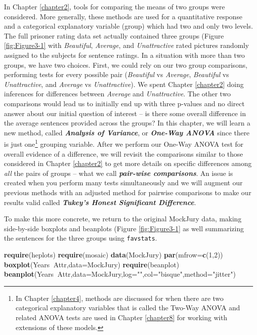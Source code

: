\documentclass[]{book}
\newenvironment{Shaded}{\begin{snugshade}}{\end{snugshade}}
\newcommand{\KeywordTok}[1]{\textcolor[rgb]{0.13,0.29,0.53}{\textbf{#1}}}
\newcommand{\DataTypeTok}[1]{\textcolor[rgb]{0.13,0.29,0.53}{#1}}
\newcommand{\DecValTok}[1]{\textcolor[rgb]{0.00,0.00,0.81}{#1}}
\newcommand{\StringTok}[1]{\textcolor[rgb]{0.31,0.60,0.02}{#1}}
\newcommand{\OperatorTok}[1]{\textcolor[rgb]{0.81,0.36,0.00}{\textbf{#1}}}
\newcommand{\NormalTok}[1]{#1}
\let\rmarkdownfootnote\footnote%
\def\footnote{\protect\rmarkdownfootnote}
\theoremstyle{definition}
\theoremstyle{definition}
\theoremstyle{remark}
\begin{document}
In Chapter \ref{chapter2}, tools for comparing the means of two groups
were considered. More generally, these methods are used for a
quantitative response and a categorical explanatory variable (group)
which had two and only two levels. The full prisoner rating data set
actually contained three groups (Figure \ref{fig:Figure3-1} with
\emph{Beautiful}, \emph{Average}, and \emph{Unattractive} rated pictures
randomly assigned to the subjects for sentence ratings. In a situation
with more than two groups, we have two choices. First, we could rely on
our two group comparisons, performing tests for every possible pair
(\emph{Beautiful} vs \emph{Average}, \emph{Beautiful} vs
\emph{Unattractive}, and \emph{Average} vs \emph{Unattractive}). We
spent Chapter \ref{chapter2} doing inferences for differences between
\emph{Average} and \emph{Unattractive}. The other two comparisons would
lead us to initially end up with three p-values and no direct answer
about our initial question of interest -- is there some overall
difference in the average sentences provided across the groups? In this
chapter, we will learn a new method, called \textbf{\emph{Analysis of
Variance}}, or \textbf{\emph{One-Way ANOVA}} since there is just
one\footnote{In Chapter \ref{chapter4}, methods are discussed for when
  there are two categorical explanatory variables that is called the
  Two-Way ANOVA and related ANOVA tests are used in Chapter
  \ref{chapter8} for working with extensions of these models.} grouping
variable. After we perform our One-Way ANOVA test for overall evidence
of a difference, we will revisit the comparisons similar to those
considered in Chapter \ref{chapter2} to get more details on specific
differences among \emph{all} the pairs of groups -- what we call
\textbf{\emph{pair-wise comparisons}}. An issue is created when you
perform many tests simultaneously and we will augment our previous
methods with an adjusted method for pairwise comparisons to make our
results valid called \textbf{\emph{Tukey's Honest Significant
Difference}}.

To make this more concrete, we return to the original MockJury data,
making side-by-side boxplots and beanplots (Figure \ref{fig:Figure3-1}
as well summarizing the sentences for the three groups using
\texttt{favstats}.




\begin{Shaded}
\begin{Highlighting}[]
\KeywordTok{require}\NormalTok{(heplots)}
\KeywordTok{require}\NormalTok{(mosaic)}
\KeywordTok{data}\NormalTok{(MockJury)}
\KeywordTok{par}\NormalTok{(}\DataTypeTok{mfrow=}\KeywordTok{c}\NormalTok{(}\DecValTok{1}\NormalTok{,}\DecValTok{2}\NormalTok{))}
\KeywordTok{boxplot}\NormalTok{(Years}\OperatorTok{~}\NormalTok{Attr,}\DataTypeTok{data=}\NormalTok{MockJury)}
\KeywordTok{require}\NormalTok{(beanplot)}
\KeywordTok{beanplot}\NormalTok{(Years}\OperatorTok{~}\NormalTok{Attr,}\DataTypeTok{data=}\NormalTok{MockJury,}\DataTypeTok{log=}\StringTok{""}\NormalTok{,}\DataTypeTok{col=}\StringTok{"bisque"}\NormalTok{,}\DataTypeTok{method=}\StringTok{"jitter"}\NormalTok{)}
\end{Highlighting}
\end{Shaded}
\end{document}
